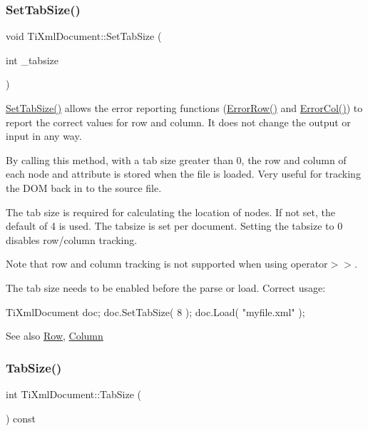 \subsubsection{\texorpdfstring{Set\+Tab\+Size()}{SetTabSize()}}
{\footnotesize\ttfamily void Ti\+Xml\+Document\+::\+Set\+Tab\+Size (\begin{DoxyParamCaption}\item[{int}]{\+\_\+tabsize }\end{DoxyParamCaption})\hspace{0.3cm}{\ttfamily [inline]}}

\hyperlink{class_ti_xml_document_a51dac56316f89b35bdb7d0d433ba988e}{Set\+Tab\+Size()} allows the error reporting functions (\hyperlink{class_ti_xml_document_a062e5257128a7da31b0b2e38cd524600}{Error\+Row()} and \hyperlink{class_ti_xml_document_adea69de889449a2587afb8ee043f43f5}{Error\+Col()}) to report the correct values for row and column. It does not change the output or input in any way.

By calling this method, with a tab size greater than 0, the row and column of each node and attribute is stored when the file is loaded. Very useful for tracking the D\+OM back in to the source file.

The tab size is required for calculating the location of nodes. If not set, the default of 4 is used. The tabsize is set per document. Setting the tabsize to 0 disables row/column tracking.

Note that row and column tracking is not supported when using operator$>$$>$.

The tab size needs to be enabled before the parse or load. Correct usage\+: \begin{DoxyVerb}TiXmlDocument doc;
doc.SetTabSize( 8 );
doc.Load( "myfile.xml" );
\end{DoxyVerb}


\begin{DoxySeeAlso}{See also}
\hyperlink{class_ti_xml_base_ad0cacca5d76d156b26511f46080b442e}{Row}, \hyperlink{class_ti_xml_base_ad283b95d9858d5d78c334f4a61b07bb4}{Column} 
\end{DoxySeeAlso}
\mbox{\label{class_ti_xml_document_a81e6ffeee8f5d025a171eabf79abdad7}} 
\subsubsection{\texorpdfstring{Tab\+Size()}{TabSize()}}
{\footnotesize\ttfamily int Ti\+Xml\+Document\+::\+Tab\+Size (\begin{DoxyParamCaption}{ }\end{DoxyParamCaption}) const\hspace{0.3cm}{\ttfamily [inline]}}

